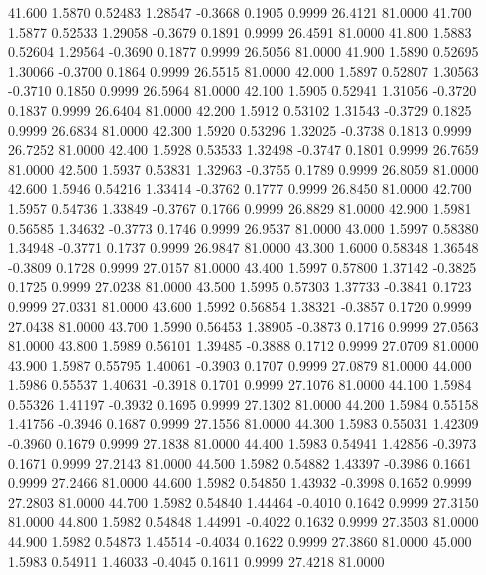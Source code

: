   41.600   1.5870   0.52483   1.28547  -0.3668   0.1905   0.9999  26.4121  81.0000
  41.700   1.5877   0.52533   1.29058  -0.3679   0.1891   0.9999  26.4591  81.0000
  41.800   1.5883   0.52604   1.29564  -0.3690   0.1877   0.9999  26.5056  81.0000
  41.900   1.5890   0.52695   1.30066  -0.3700   0.1864   0.9999  26.5515  81.0000
  42.000   1.5897   0.52807   1.30563  -0.3710   0.1850   0.9999  26.5964  81.0000
  42.100   1.5905   0.52941   1.31056  -0.3720   0.1837   0.9999  26.6404  81.0000
  42.200   1.5912   0.53102   1.31543  -0.3729   0.1825   0.9999  26.6834  81.0000
  42.300   1.5920   0.53296   1.32025  -0.3738   0.1813   0.9999  26.7252  81.0000
  42.400   1.5928   0.53533   1.32498  -0.3747   0.1801   0.9999  26.7659  81.0000
  42.500   1.5937   0.53831   1.32963  -0.3755   0.1789   0.9999  26.8059  81.0000
  42.600   1.5946   0.54216   1.33414  -0.3762   0.1777   0.9999  26.8450  81.0000
  42.700   1.5957   0.54736   1.33849  -0.3767   0.1766   0.9999  26.8829  81.0000
  42.900   1.5981   0.56585   1.34632  -0.3773   0.1746   0.9999  26.9537  81.0000
  43.000   1.5997   0.58380   1.34948  -0.3771   0.1737   0.9999  26.9847  81.0000
  43.300   1.6000   0.58348   1.36548  -0.3809   0.1728   0.9999  27.0157  81.0000
  43.400   1.5997   0.57800   1.37142  -0.3825   0.1725   0.9999  27.0238  81.0000
  43.500   1.5995   0.57303   1.37733  -0.3841   0.1723   0.9999  27.0331  81.0000
  43.600   1.5992   0.56854   1.38321  -0.3857   0.1720   0.9999  27.0438  81.0000
  43.700   1.5990   0.56453   1.38905  -0.3873   0.1716   0.9999  27.0563  81.0000
  43.800   1.5989   0.56101   1.39485  -0.3888   0.1712   0.9999  27.0709  81.0000
  43.900   1.5987   0.55795   1.40061  -0.3903   0.1707   0.9999  27.0879  81.0000
  44.000   1.5986   0.55537   1.40631  -0.3918   0.1701   0.9999  27.1076  81.0000
  44.100   1.5984   0.55326   1.41197  -0.3932   0.1695   0.9999  27.1302  81.0000
  44.200   1.5984   0.55158   1.41756  -0.3946   0.1687   0.9999  27.1556  81.0000
  44.300   1.5983   0.55031   1.42309  -0.3960   0.1679   0.9999  27.1838  81.0000
  44.400   1.5983   0.54941   1.42856  -0.3973   0.1671   0.9999  27.2143  81.0000
  44.500   1.5982   0.54882   1.43397  -0.3986   0.1661   0.9999  27.2466  81.0000
  44.600   1.5982   0.54850   1.43932  -0.3998   0.1652   0.9999  27.2803  81.0000
  44.700   1.5982   0.54840   1.44464  -0.4010   0.1642   0.9999  27.3150  81.0000
  44.800   1.5982   0.54848   1.44991  -0.4022   0.1632   0.9999  27.3503  81.0000
  44.900   1.5982   0.54873   1.45514  -0.4034   0.1622   0.9999  27.3860  81.0000
  45.000   1.5983   0.54911   1.46033  -0.4045   0.1611   0.9999  27.4218  81.0000
